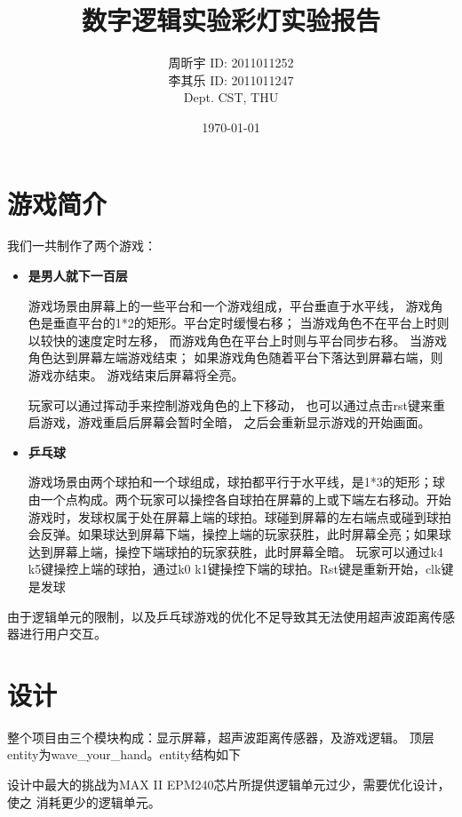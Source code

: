 \documentclass{article}
\title{数字逻辑实验彩灯实验报告}
\author{周昕宇 ID: 2011011252\\李其乐 ID: 2011011247\\ Dept. CST, THU}
\date{\today}
\begin{document}
\maketitle
\tableofcontents
\clearpage

\section{游戏简介}
\begin{spacing}{1.62}
	我们一共制作了两个游戏：
	\begin{itemize}
		\item {\bf 是男人就下一百层 }

			游戏场景由屏幕上的一些平台和一个游戏组成，平台垂直于水平线，
			游戏角色是垂直平台的1*2的矩形。平台定时缓慢右移；
			当游戏角色不在平台上时则以较快的速度定时左移，
			而游戏角色在平台上时则与平台同步右移。
			当游戏角色达到屏幕左端游戏结束；
			如果游戏角色随着平台下落达到屏幕右端，则游戏亦结束。
			游戏结束后屏幕将全亮。

			玩家可以通过挥动手来控制游戏角色的上下移动，
			也可以通过点击rst键来重启游戏，游戏重启后屏幕会暂时全暗，
			之后会重新显示游戏的开始画面。

		\item {\bf 乒乓球}

			游戏场景由两个球拍和一个球组成，球拍都平行于水平线，是1*3的矩形；球由一个点构成。两个玩家可以操控各自球拍在屏幕的上或下端左右移动。开始游戏时，发球权属于处在屏幕上端的球拍。球碰到屏幕的左右端点或碰到球拍会反弹。如果球达到屏幕下端，操控上端的玩家获胜，此时屏幕全亮；如果球达到屏幕上端，操控下端球拍的玩家获胜，此时屏幕全暗。
			玩家可以通过k4 k5键操控上端的球拍，通过k0
			k1键操控下端的球拍。Rst键是重新开始，clk键是发球
	\end{itemize}


	由于逻辑单元的限制，以及乒乓球游戏的优化不足导致其无法使用超声波距离传感器进行用户交互。
\end{spacing}

\section{设计}

\begin{spacing}{1.62}
整个项目由三个模块构成：显示屏幕，超声波距离传感器，及游戏逻辑。
顶层entity为wave\_your\_hand。entity结构如下

设计中最大的挑战为MAX II EPM240芯片所提供逻辑单元过少，需要优化设计，使之
消耗更少的逻辑单元。

\end{spacing}
\end{document}
